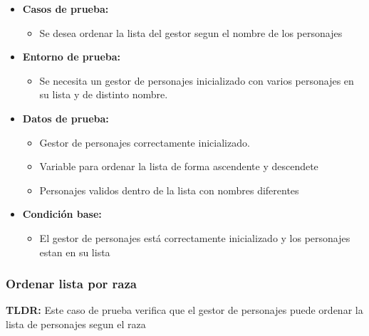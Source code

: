 \documentclass{article}
\begin{document}
\begin{itemize}
	\item \textbf{Casos de prueba:}
	\begin{itemize}
		\item Se desea ordenar la lista del gestor segun el nombre de los personajes
	\end{itemize}
	
	\item \textbf{Entorno de prueba:}
	\begin{itemize}
		\item Se necesita un gestor de personajes inicializado con varios personajes en su lista y de distinto nombre.
	\end{itemize}
	
	\item \textbf{Datos de prueba:}
	\begin{itemize}
		\item Gestor de personajes correctamente inicializado.
        \item Variable para ordenar la lista de forma ascendente y descendete
		\item Personajes validos dentro de la lista con nombres diferentes
	\end{itemize}
	
	\item \textbf{Condición base:}
	\begin{itemize}
		\item El gestor de personajes está correctamente inicializado y los personajes estan en su lista
	\end{itemize}
	
\end{itemize}

\subsubsection{Ordenar lista por raza}
\textbf{TLDR:} Este caso de prueba verifica que el gestor de personajes puede ordenar la lista de personajes segun el raza 
\end{document}
